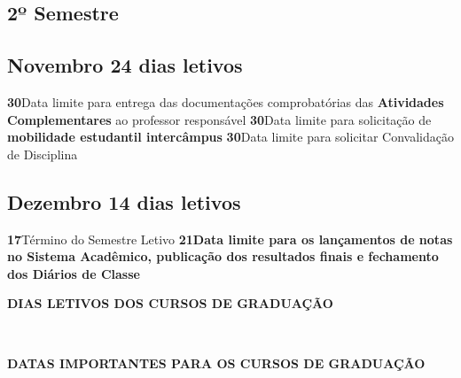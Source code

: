 \documentclass[thesis]{hmcposter}
\begin{document}
\begin{poster}
\section{\hfill \color{hmcorange}2º Semestre}
\subsection{Novembro \hfill 24 dias letivos}\textbf{30}\qquad Data limite para entrega das documentações comprobatórias das \textbf{Atividades Complementares} ao professor responsável \newline \null\textbf{30}\qquad Data limite para solicitação de \textbf{mobilidade estudantil intercâmpus} \newline \null\textbf{30}\qquad Data limite para solicitar Convalidação de Disciplina \newline \null\subsection{Dezembro \hfill 14 dias letivos}\textbf{17}\qquad Término do Semestre Letivo \newline \null\textbf{21}\qquad \textbf{Data limite para os lançamentos de notas no Sistema Acadêmico, publicação dos resultados finais e fechamento dos Diários de Classe} \newline \null\newpage
~
\vfill
\begin{center}
\large \textbf{DIAS LETIVOS DOS CURSOS DE GRADUAÇÃO}
\newline
\null
\newline
\begin{table}
\centering
{}
\end{table}
\null
\end{center}
\vfill
\null
\columnbreak
~
\vfill
\begin{center}
\large \textbf{DATAS IMPORTANTES PARA OS CURSOS DE GRADUAÇÃO}

\end{center}
\end{poster}
\end{document}
